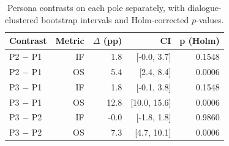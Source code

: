 \begin{table}[t]
\centering
\small
\caption{Persona contrasts on each pole separately, with dialogue-clustered bootstrap intervals and Holm-corrected $p$-values.}
\label{tab:persona_contrasts}
\begin{tabular}{lrrrr}
\toprule
Contrast & Metric & $\Delta$ (pp) & CI & p (Holm) \\
\midrule
P2 $-$ P1 & IF & 1.8 & [-0.0, 3.7] & 0.1548 \\
P2 $-$ P1 & OS & 5.4 & [2.4, 8.4] & 0.0006 \\
P3 $-$ P1 & IF & 1.8 & [-0.1, 3.8] & 0.1548 \\
P3 $-$ P1 & OS & 12.8 & [10.0, 15.6] & 0.0006 \\
P3 $-$ P2 & IF & -0.0 & [-1.8, 1.8] & 0.9860 \\
P3 $-$ P2 & OS & 7.3 & [4.7, 10.1] & 0.0006 \\
\bottomrule
\end{tabular}
\end{table}
